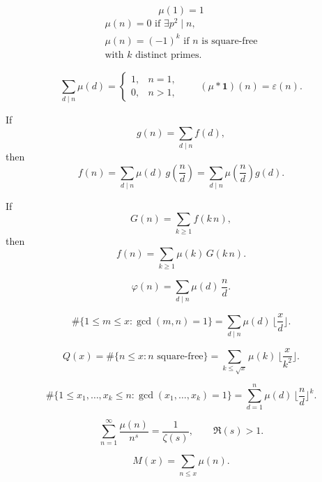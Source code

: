 
\[
\mu(1)=1
\]
\begin{gather*}
\mu(n)=0 \text{ if } \exists p^2\mid n,\\
\mu(n)=(-1)^k \text{ if } n \text{ is square-free}\\
\text{with } k \text{ distinct primes.}
\end{gather*}

\[
\sum_{d\mid n}\mu(d)=
\begin{cases}
1,& n=1,\\[2pt]
0,& n>1,
\end{cases}
\qquad
(\mu * \mathbf{1})(n)=\varepsilon(n).
\]

If
\[
g(n)=\sum_{d\mid n} f(d),
\]
then
\[
f(n)=\sum_{d\mid n}\mu(d)\,g\!\left(\frac{n}{d}\right)
=\sum_{d\mid n}\mu\!\left(\frac{n}{d}\right)g(d).
\]

If
\[
G(n)=\sum_{k\ge 1} f(k\,n),
\]
then
\[
f(n)=\sum_{k\ge 1}\mu(k)\,G(k\,n).
\]

\[
\varphi(n)=\sum_{d\mid n}\mu(d)\,\frac{n}{d}.
\]

\[
\#\{1\le m\le x:\gcd(m,n)=1\}
=\sum_{d\mid n}\mu(d)\,\Big\lfloor \frac{x}{d}\Big\rfloor.
\]

\[
Q(x)=\#\{n\le x: n \text{ square-free}\}
=\sum_{k\le \sqrt{x}}\mu(k)\,\Big\lfloor \frac{x}{k^2}\Big\rfloor.
\]

\[
\#\{1\le x_1,\dots,x_k\le n:\gcd(x_1,\dots,x_k)=1\}
=\sum_{d=1}^{n}\mu(d)\,\Big\lfloor \frac{n}{d}\Big\rfloor^{k}.
\]

\[
\sum_{n=1}^{\infty}\frac{\mu(n)}{n^{s}}=\frac{1}{\zeta(s)},\qquad \Re(s)>1.
\]

\[
M(x)=\sum_{n\le x}\mu(n).
\]
